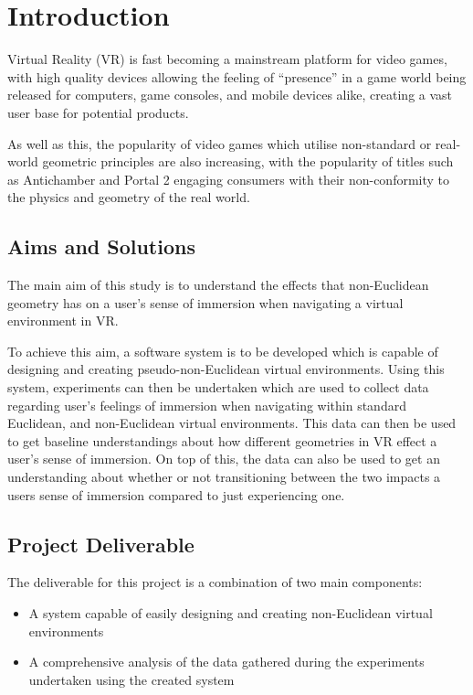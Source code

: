 \chapter{Introduction}
\label{intro}

	Virtual Reality (VR) is fast becoming a mainstream platform for video games, with high quality devices allowing the feeling of \enquote{presence} in a game world being released for computers, game consoles, and mobile devices alike, creating a vast user base for potential products.

	As well as this, the popularity of video games which utilise non-standard or real-world geometric principles are also increasing, with the popularity of titles such as Antichamber \cite{Antichamber2013} and Portal 2 \cite{Portal22011} engaging consumers with their non-conformity to the physics and geometry of the real world.

	\section{Aims and Solutions}

		The main aim of this study is to understand the effects that non-Euclidean geometry has on a user's sense of immersion when navigating a virtual environment in VR.

		To achieve this aim, a software system is to be developed which is capable of designing and creating pseudo-non-Euclidean virtual environments.
		Using this system, experiments can then be undertaken which are used to collect data regarding user's feelings of immersion when navigating within standard Euclidean, and non-Euclidean virtual environments.
		This data can then be used to get baseline understandings about how different geometries in VR effect a user's sense of immersion.
		On top of this, the data can also be used to get an understanding about whether or not transitioning between the two impacts a users sense of immersion compared to just experiencing one.

	\section{Project Deliverable}

		The deliverable for this project is a combination of two main components:
		\begin{itemize}
			\item A system capable of easily designing and creating non-Euclidean virtual environments %

			\item A comprehensive analysis of the data gathered during the experiments undertaken using the created system %
		\end{itemize}

